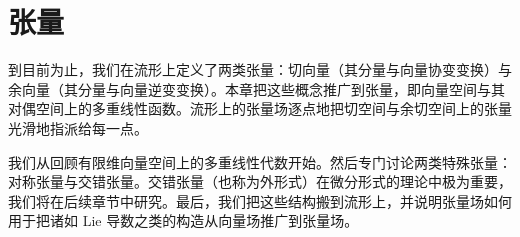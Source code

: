 \documentclass[../main.tex]{subfiles}
\begin{document}
\chapter{张量}\label{chapter:ch12-张量}

到目前为止，我们在流形上定义了两类张量：切向量（其分量与向量协变变换）与余向量（其分量与向量逆变变换）。本章把这些概念推广到张量，即向量空间与其对偶空间上的多重线性函数。流形上的张量场逐点地把切空间与余切空间上的张量光滑地指派给每一点。

我们从回顾有限维向量空间上的多重线性代数开始。然后专门讨论两类特殊张量：对称张量与交错张量。交错张量（也称为外形式）在微分形式的理论中极为重要，我们将在后续章节中研究。最后，我们把这些结构搬到流形上，并说明张量场如何用于把诸如 Lie 导数之类的构造从向量场推广到张量场。





\end{document}
